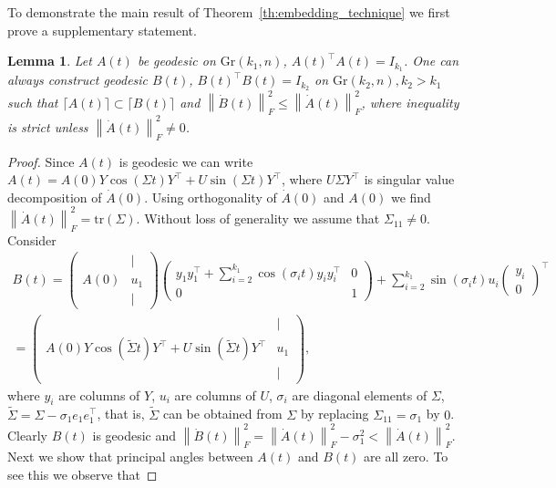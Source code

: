 \documentclass{article}
\newtheorem{lemma}{Lemma}
\begin{document}
To demonstrate the main result of Theorem~\ref{th:embedding_technique} we first prove a supplementary statement.
\begin{lemma}
	\label{le:geodesic_embedding}
	Let $A(t)$ be geodesic on $\text{Gr}(k_1, n)$, $A(t)^\top A(t) = I_{k_1}$. One can always construct geodesic $B(t)$, $B(t)^\top B(t) = I_{k_2}$ on $\text{Gr}(k_2, n), k_2>k_1$ such that $\lceil A(t)\rceil\subset \lceil B(t)\rceil$ and $\left\|\dot{B}(t)\right\|_{F}^2 \leq \left\|\dot{A}(t)\right\|_{F}^2$, where inequality is strict unless $ \left\|\dot{A}(t)\right\|_{F}^2 \neq 0$.
\end{lemma}
\begin{proof}
	Since $A(t)$ is geodesic we can write $A(t) = A(0) Y \cos(\Sigma t) Y^\top + U\sin(\Sigma t) Y^\top$, where $U \Sigma Y^\top$ is singular value decomposition of $\dot{A}(0)$. Using orthogonality of $\dot{A}(0)$ and $A(0)$ we find $\left\| \dot{A}(t)\right\|_{F}^2 = \text{tr}(\Sigma)$. Without loss of generality we assume that $\Sigma_{11} \neq 0$. Consider
\begin{multline}
	B(t) =
	\begin{pmatrix}
		& | \\
		A(0) & u_1\\
		&|
	\end{pmatrix}
	\begin{pmatrix}
		y_1y_1^\top + \sum_{i=2}^{k_1} \cos(\sigma_i t)y_i y_i^\top & 0\\
		0 & 1
	\end{pmatrix} + \sum_{i=2}^{k_1} \sin(\sigma_i t)u_i \begin{pmatrix}y_i\\0\end{pmatrix}^\top \\
	= \begin{pmatrix}
		& | \\
		A(0) Y \cos\left(\widetilde{\Sigma}t\right) Y^\top + U \sin\left(\widetilde{\Sigma}t\right) Y^\top & u_1\\
		&|
	\end{pmatrix},
\end{multline}
where $y_i$ are columns of $Y$, $u_i$ are columns of $U$, $\sigma_i$ are diagonal elements of $\Sigma$, $\widetilde{\Sigma} = \Sigma - \sigma_1e_1 e_1^\top$, that is, $\widetilde{\Sigma}$ can be obtained from $\Sigma$ by replacing $\Sigma_{11} = \sigma_1$ by $0$.
Clearly $B(t)$ is geodesic and $\left\| \dot{B}(t)\right\|_{F}^2 = \left\| \dot{A}(t)\right\|_{F}^2 - \sigma_1^2 < \left\| \dot{A}(t)\right\|_{F}^2$. Next we show that principal angles between $A(t)$ and $B(t)$ are all zero. To see this we observe that

\end{proof}
\end{document}
